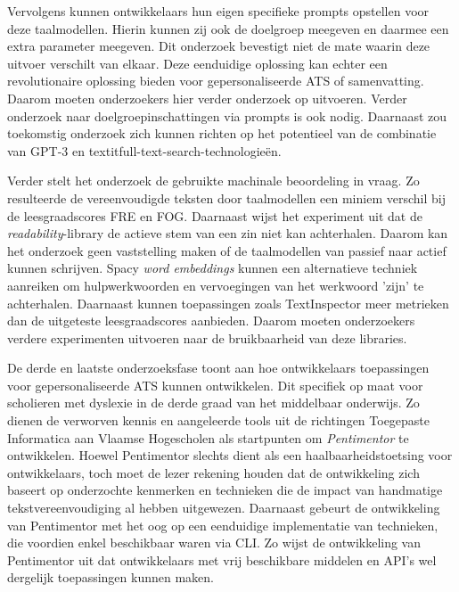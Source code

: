 \medspace

Vervolgens kunnen ontwikkelaars hun eigen specifieke prompts opstellen voor deze taalmodellen. Hierin kunnen zij ook de doelgroep meegeven en daarmee een extra parameter meegeven. Dit onderzoek bevestigt niet de mate waarin deze uitvoer verschilt van elkaar. Deze eenduidige oplossing kan echter een revolutionaire oplossing bieden voor gepersonaliseerde ATS of samenvatting. Daarom moeten onderzoekers hier verder onderzoek op uitvoeren. Verder onderzoek naar doelgroepinschattingen via prompts is ook nodig. Daarnaast zou toekomstig onderzoek zich kunnen richten op het potentieel van de combinatie van GPT-3 en textit{full-text-search}-technologieën. 

\medspace

Verder stelt het onderzoek de gebruikte machinale beoordeling in vraag. Zo resulteerde de vereenvoudigde teksten door taalmodellen een miniem verschil bij de leesgraadscores FRE en FOG. Daarnaast wijst het experiment uit dat de \textit{readability}-library de actieve stem van een zin niet kan achterhalen. Daarom kan het onderzoek geen vaststelling maken of de taalmodellen van passief naar actief kunnen schrijven. Spacy \textit{word embeddings} kunnen een alternatieve techniek aanreiken om hulpwerkwoorden en vervoegingen van het werkwoord 'zijn' te achterhalen. Daarnaast kunnen toepassingen zoals TextInspector meer metrieken dan de uitgeteste leesgraadscores aanbieden. Daarom moeten onderzoekers verdere experimenten uitvoeren naar de bruikbaarheid van deze libraries. 

\medspace

De derde en laatste onderzoeksfase toont aan hoe ontwikkelaars toepassingen voor gepersonaliseerde ATS kunnen ontwikkelen. Dit specifiek op maat voor scholieren met dyslexie in de derde graad van het middelbaar onderwijs. Zo dienen de verworven kennis en aangeleerde tools uit de richtingen Toegepaste Informatica aan Vlaamse Hogescholen als startpunten om \textit{Pentimentor} te ontwikkelen. Hoewel Pentimentor slechts dient als een haalbaarheidstoetsing voor ontwikkelaars, toch moet de lezer rekening houden dat de ontwikkeling zich baseert op onderzochte kenmerken en technieken die de impact van handmatige tekstvereenvoudiging al hebben uitgewezen. Daarnaast gebeurt de ontwikkeling van Pentimentor met het oog op een eenduidige implementatie van technieken, die voordien enkel beschikbaar waren via CLI. Zo wijst de ontwikkeling van Pentimentor uit dat ontwikkelaars met vrij beschikbare middelen en API's wel dergelijk toepassingen kunnen maken.

